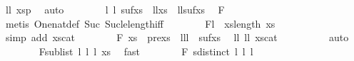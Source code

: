 \begin{isabellebody}
\ l{}l{}\ xs{}p{}\ \isamarkupfalse%
\ auto\isanewline
\isanewline
\ \ \ \ \ \ \isamarkupfalse%
\ l{}\ l{}\ sufxs{}\ \ l{}l{}{\isacharcolon}{\kern0pt}{\isachardoublequoteopen}xs{}\ {\isacharequal}{\kern0pt}\ l{}{\isacharhash}{\kern0pt}l{}{\isacharhash}{\kern0pt}sufxs{}{\isachardoublequoteclose}\ \isamarkupfalse%
\ F{}{\isacharparenleft}{\kern0pt}{}{\isacharparenright}{\kern0pt}\isanewline
\ \ \ \ \ \ \ \ \isamarkupfalse%
\ {\isacharparenleft}{\kern0pt}metis\ One{\isacharunderscore}{\kern0pt}nat{\isacharunderscore}{\kern0pt}def\ Suc{\isacharunderscore}{\kern0pt}{}\ Suc{\isacharunderscore}{\kern0pt}le{\isacharunderscore}{\kern0pt}length{\isacharunderscore}{\kern0pt}iff{\isacharparenright}{\kern0pt}\isanewline
\ \ \ \ \ \ \isamarkupfalse%
\ F{}{\isacharcolon}{\kern0pt}{\isachardoublequoteopen}l{}\ {\isacharequal}{\kern0pt}\ xs{\isacharbang}{\kern0pt}{\isacharparenleft}{\kern0pt}length\ xs{}{\isacharparenright}{\kern0pt}{\isachardoublequoteclose}\ \ \ \ \ \ \ \ \ \ \isamarkupfalse%
\ {\isacharparenleft}{\kern0pt}simp\ add{\isacharcolon}{\kern0pt}\ xs{\isacharunderscore}{\kern0pt}cat{\isacharparenright}{\kern0pt}\isanewline
\ \ \ \ \ \ \isamarkupfalse%
\ F{}{}{\isacharcolon}{\kern0pt}\ {\isachardoublequoteopen}xs\ {\isacharequal}{\kern0pt}\ prexs{}\ {\isacharat}{\kern0pt}\ {\isacharbrackleft}{\kern0pt}l{}{\isacharcomma}{\kern0pt}l{}{\isacharcomma}{\kern0pt}l{}{\isacharbrackright}{\kern0pt}\ {\isacharat}{\kern0pt}\ sufxs{}{\isachardoublequoteclose}\ \isamarkupfalse%
\ l{}l{}\ l{}l{}\ xs{\isacharunderscore}{\kern0pt}cat\isanewline
\ \ \ \ \ \ \ \ \isamarkupfalse%
\ auto\isanewline
\ \ \ \ \ \ \isamarkupfalse%
\ F{}{}{\isacharcolon}{\kern0pt}{\isachardoublequoteopen}sublist\ {\isacharbrackleft}{\kern0pt}l{}{\isacharcomma}{\kern0pt}\ l{}{\isacharcomma}{\kern0pt}\ l{}{\isacharbrackright}{\kern0pt}\ xs{\isachardoublequoteclose}\ \isamarkupfalse%
\ fast\isanewline
\ \ \ \ \ \ \isamarkupfalse%
\ F{}{}{\isacharcolon}{\kern0pt}\ {\isachardoublequoteopen}sdistinct\ {\isacharbrackleft}{\kern0pt}l{}{\isacharcomma}{\kern0pt}\ l{}{\isacharcomma}{\kern0pt}\ l{}{\isacharbrackright}{\kern0pt}{\isachardoublequoteclose}\ \isamarkupfalse%

\end{isabellebody}
